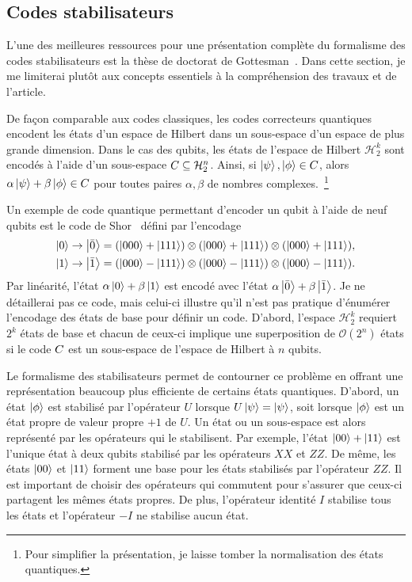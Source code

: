 \subsection{Codes stabilisateurs}
\label{sec:codes_stabs}

L'une des meilleures ressources pour une présentation complète du formalisme des codes
stabilisateurs est la thèse de doctorat de Gottesman~\cite{gottesman_stabilizer_1997}.
Dans cette section,
je me limiterai plutôt aux concepts essentiels à la compréhension des travaux et de l'article.

De façon comparable aux codes classiques,
les codes correcteurs quantiques encodent les états d'un espace de Hilbert
dans un sous-espace d'un espace de plus grande dimension.
Dans le cas des qubits,
les états de l'espace de Hilbert $\mathcal H_2^k$ sont encodés à l'aide d'un
sous-espace $C \subseteq \mathcal H_2^n$.
Ainsi,
si $\ket\psi, \ket\phi \in C$,
alors $\alpha\ket\psi + \beta\ket\phi \in C$ 
pour toutes paires $\alpha, \beta$ de nombres complexes.~\footnote{
  Pour simplifier la présentation,
  je laisse tomber la normalisation des états quantiques.
}

Un exemple de code quantique permettant d'encoder un qubit à l'aide de neuf qubits est 
le code de Shor~\cite{shor_scheme_1995} défini par l'encodage
\begin{align}
  \ket{0} \to \ket{\bar{0}} = (\ket{000} + \ket{111}) \otimes (\ket{000} + \ket{111}) \otimes (\ket{000} + \ket{111}), \notag \\
  \ket{1} \to \ket{\bar{1}} = (\ket{000} - \ket{111}) \otimes (\ket{000} - \ket{111}) \otimes (\ket{000} - \ket{111}).
  \label{eq:code_shor}
\end{align}
Par linéarité, l'état $\alpha \ket{0} + \beta \ket{1}$ est encodé avec l'état 
$\alpha \ket{\bar{0}} + \beta\ket{\bar {1}}$.
Je ne détaillerai pas ce code,
mais celui-ci illustre qu'il n'est pas pratique d'énumérer l'encodage des états de base
pour définir un code.
D'abord,
l'espace $\mathcal H_2^k$ requiert $2^k$ états de base
et chacun de ceux-ci implique une superposition de $\mathcal O(2^n)$ états
si le code $C$ est un sous-espace de l'espace de Hilbert à $n$ qubits.

Le formalisme des stabilisateurs permet de contourner ce problème en offrant une 
représentation beaucoup plus efficiente de certains états quantiques.
D'abord,
un état $\ket\phi$ est stabilisé par l'opérateur $U$ lorsque $U\ket\psi = \ket\psi$,
soit lorsque $\ket \phi$ est un état propre de valeur propre $+1$ de $U$.
Un état ou un sous-espace est alors représenté par les opérateurs qui le stabilisent.
Par exemple,
l'état $\ket{00} + \ket{11}$ est l'unique état à deux qubits stabilisé par 
les opérateurs $XX$ et $ZZ$. 
De même,
les états $\ket{00}$ et $\ket{11}$ forment une base
pour les états stabilisés par l'opérateur $ZZ$.
Il est important de choisir des opérateurs qui commutent pour s'assurer 
que ceux-ci partagent les mêmes états propres.
De plus, l'opérateur identité $I$ stabilise tous les états
et l'opérateur $-I$ ne stabilise aucun état.

